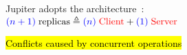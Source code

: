 
\begin{frame}{}
  \centerline{\Huge {}}
\end{frame}

\begin{frame}{}
  \begin{center}
    {\large Jupiter adopts the  architecture~:} \\[3pt]
    {\large $\textcolor{blue}{(n+1)}\; \text{replicas} \triangleq \textcolor{blue}{(n)}\; \text{\textcolor{red}{Client}} + \textcolor{blue}{(1)}\; \text{\textcolor{red}{Server}}$}
  \end{center}

  \begin{center}
    \begin{minipage}{0.50\textwidth}
      
    \end{minipage}
  \end{center}

  \vspace{-1.00cm}
\end{frame}

\begin{frame}{}
  \begin{center}
    {\large {} \hl{Conflicts caused by concurrent operations}} \\ \pause
    {\small {}}
  \end{center}

  \vspace{-0.50cm}
  \begin{columns}
      \begin{center}
	
      \end{center}
      \begin{center}
	
      \end{center}
  \end{columns}

  \begin{center}
  \end{center}
\end{frame}

